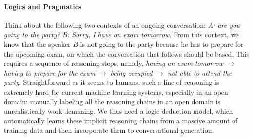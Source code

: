 \paragraph{Logics and Pragmatics}
Think about the following two contexts of an ongoing conversation: {\it A: are you going to the party?} {\it B: Sorry, I have an  exam tomorrow}. 
 From this context, we know that the speaker $B$ is not going to the party because he has to prepare for the upcoming exam, on which 
 the conversation that follows should be based. This requires a sequence of reasoning steps, namely,
 {\it having an exam tomorrow} $\rightarrow$ 
  {\it having to prepare for the exam} $\rightarrow$ {\it being occupied } $\rightarrow$ {\it not able to attend the party}. Straightforward as it seems to humans, 
  such a line of reasoning is 
  extremely hard for current machine learning systems, especially in an open-domain: manually labeling all the reasoning chains in an open domain is unrealistically work-demaning. 
  We thus need a logic deduction model, which automatically learns these implicit reasoning chains from a massive amount of training data and then incorporate them to conversational generation. 
     

